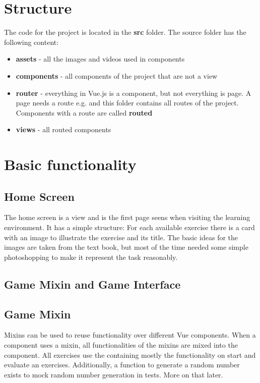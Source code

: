 \section{Structure}
\label{section:structure}
The code for the project is located in the \textbf{src} folder. The source folder has the following content: 

\begin{itemize}
    \item \textbf{assets} - all the images and videos used in components
    \item \textbf{components} - all components of the project that are not a view
    \item \textbf{router} - everything in Vue.js is a component, but not everything is page. A page needs a route e.g.  and this folder contains all routes of the project. Components with a route are called \textbf{routed}
    \item \textbf{views} - all routed components
\end{itemize}

\section{Basic functionality}
\label{section:basicFunctionality}

\subsection{Home Screen}
The home screen is a view and is the first page seens when visiting the learning environment. It has a simple structure: For each available exercise there is a card with an image to illustrate the exercise and its title. The basic ideas for the images are taken from the text book, but most of the time needed some simple photoshopping to make it represent the task reasonably.

\subsection{Game Mixin and Game Interface}

\subsection*{Game Mixin}
Mixins can be used to reuse functionality over different Vue components. When a component uses a mixin, all functionalities of the mixins are mixed into the component. All exercises use the  containing mostly the functionality on start and evaluate an exercises. Additionally, a function to generate a random number exists to mock random number generation in tests. More on that later.

